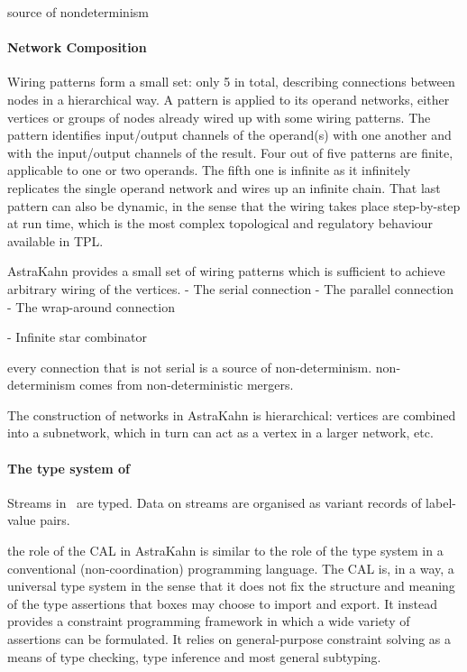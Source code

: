 source of nondeterminism



\paragraph{Network Composition}

Wiring patterns form a small set: only 5 in total, describing connections between
nodes in a hierarchical way. A pattern is applied to its operand networks, either vertices or groups of nodes already wired up with some wiring patterns. The pattern identifies input/output channels of the operand(s) with one another and with the input/output channels of the result. Four out of five patterns are finite, applicable to one or two operands. The fifth one is infinite as it infinitely replicates the single operand network and wires up an infinite chain. That last pattern can also be dynamic, in the sense that the wiring takes place step-by-step at run time, which is the most complex topological and regulatory behaviour available in TPL.

AstraKahn provides a small set of wiring patterns which is sufficient to achieve arbitrary wiring of the vertices.
- The serial connection
- The parallel connection
- The wrap-around connection

- Infinite star combinator

every connection that is not serial is a source of non-determinism. non-determinism comes from non-deterministic mergers.

The construction of networks in AstraKahn is hierarchical: vertices are combined into a subnetwork, which in turn can act as a vertex in a larger network, etc.


\paragraph{The type system of \ak\ }

Streams in \ak\ are typed. Data on streams are organised as variant records of label-value pairs. 


the role of the CAL in AstraKahn is similar to the role
of the type system in a conventional (non-coordination) programming language. The CAL is, in a way, a universal type system in the sense that it does not fix the structure and meaning of the type assertions that boxes may choose to import and export. It instead provides a constraint programming framework in which a wide variety of assertions can be formulated. It relies on general-purpose constraint solving as a means of type checking, type inference and most general subtyping.

